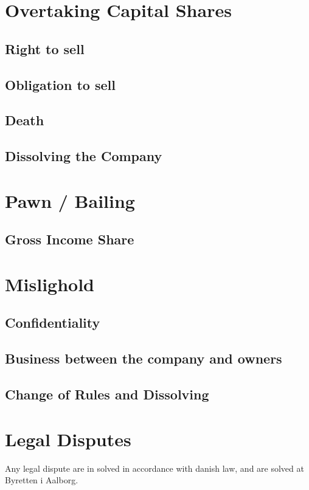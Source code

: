 \documentclass[a4paper,12pt,oneside,fleqn]{article}
\begin{document}
\section{Overtaking Capital Shares}

\subsection{Right to sell}

\subsection{Obligation to sell}

\subsection{Death}

\subsection{Dissolving the Company}

\section{Pawn / Bailing}

\subsection{Gross Income Share}

\section{Mislighold}

\subsection{Confidentiality}

\subsection{Business between the company and owners}

\subsection{Change of Rules and Dissolving}

\section{Legal Disputes}
Any legal dispute are in solved in accordance with danish law, and are solved at Byretten i Aalborg.
\end{document}
